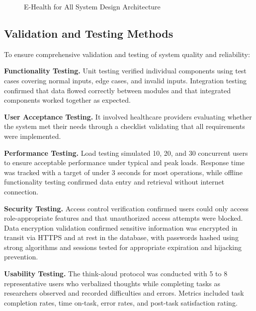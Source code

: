 \documentclass{research}
\begin{document}
\begin{figure}[H]
  \centering
  \caption{E-Health for All System Design Architecture}
  \label{fig:architecture}
\end{figure}

\subsection*{Validation and Testing Methods}

To ensure comprehensive validation and testing of system quality and reliability:

\textbf{Functionality Testing.} Unit testing verified individual components using test cases
covering normal inputs, edge cases, and invalid inputs. Integration testing confirmed that data
flowed correctly between modules and that integrated components worked together as expected.

\textbf{User Acceptance Testing.} It involved healthcare providers evaluating whether the system
met their needs through a checklist validating that all requirements were implemented.

\textbf{Performance Testing.} Load testing simulated 10, 20, and 30 concurrent users to ensure
acceptable performance under typical and peak loads. Response time was tracked with a target of
under 3 seconds for most operations, while offline functionality testing confirmed data entry and
retrieval without internet connection.

\textbf{Security Testing.} Access control verification confirmed users could only access
role-appropriate features and that unauthorized access attempts were blocked. Data encryption
validation confirmed sensitive information was encrypted in transit via HTTPS and at rest in the
database, with passwords hashed using strong algorithms and sessions tested for appropriate
expiration and hijacking prevention.

\textbf{Usability Testing.} The think-aloud protocol was conducted with 5 to 8 representative
users who verbalized thoughts while completing tasks as researchers observed and recorded
difficulties and errors. Metrics included task completion rates, time on-task, error rates, and
post-task satisfaction rating.
\end{document}

